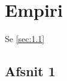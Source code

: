 \chapter{Empiri}
\label{Ch:3}

Se \vref{sec:1.1}

\lipsum*

\section{Afsnit 1}
\label{sec:1.1}

\lipsum*